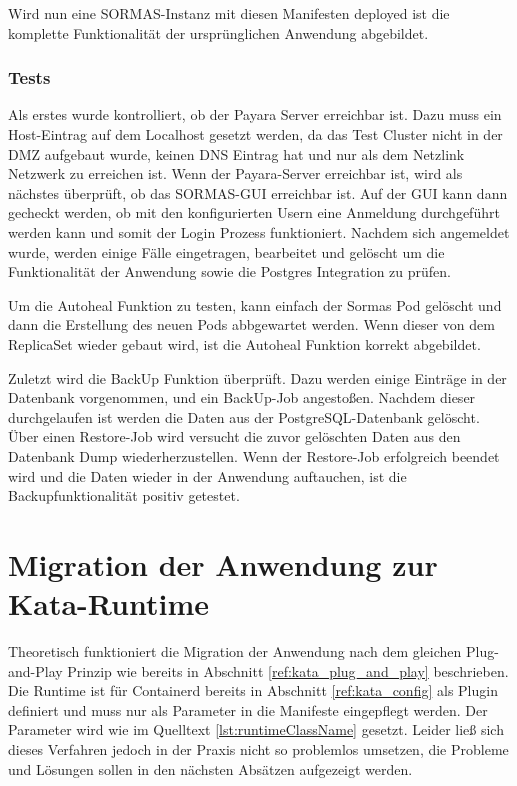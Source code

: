 Wird nun eine \ac{SORMAS}-Instanz mit diesen Manifesten deployed ist die komplette Funktionalität der ursprünglichen Anwendung abgebildet.

\subsubsection{Tests}
\label{ref:tests}
Als erstes wurde kontrolliert, ob der Payara Server erreichbar ist.
Dazu muss ein Host-Eintrag auf dem Localhost gesetzt werden, da das Test Cluster nicht in der \ac{DMZ} aufgebaut wurde, keinen \ac{DNS} Eintrag hat und nur als dem Netzlink Netzwerk zu erreichen ist. 
Wenn der Payara-Server erreichbar ist, wird als nächstes überprüft, ob das \ac{SORMAS}-\ac{GUI} erreichbar ist.
Auf der \ac{GUI} kann dann gecheckt werden, ob mit den konfigurierten Usern eine Anmeldung durchgeführt werden kann und somit der Login Prozess funktioniert.
Nachdem sich angemeldet wurde, werden einige Fälle eingetragen, bearbeitet und gelöscht um die Funktionalität der Anwendung sowie die Postgres Integration zu prüfen.

Um die Autoheal Funktion zu testen, kann einfach der Sormas Pod gelöscht und dann die Erstellung des neuen Pods abbgewartet werden.
Wenn dieser von dem ReplicaSet wieder gebaut wird, ist die Autoheal Funktion korrekt abgebildet.

Zuletzt wird die BackUp Funktion überprüft.
Dazu werden einige Einträge in der Datenbank vorgenommen, und ein BackUp-Job angestoßen. 
Nachdem dieser durchgelaufen ist werden die Daten aus der PostgreSQL-Datenbank gelöscht.
Über einen Restore-Job wird versucht die zuvor gelöschten Daten aus den Datenbank Dump wiederherzustellen. 
Wenn der Restore-Job erfolgreich beendet wird und die Daten wieder in der Anwendung auftauchen, ist die Backupfunktionalität positiv getestet.


\section{Migration der Anwendung zur Kata-Runtime}
Theoretisch funktioniert die Migration der Anwendung nach dem gleichen Plug-and-Play Prinzip wie bereits in Abschnitt \ref{ref:kata_plug_and_play} beschrieben.
Die Runtime ist für Containerd bereits in Abschnitt \ref{ref:kata_config} als Plugin definiert und muss nur als Parameter in die Manifeste eingepflegt werden.
Der Parameter wird wie im Quelltext \ref{lst:runtimeClassName} gesetzt.
Leider ließ sich dieses Verfahren jedoch in der Praxis nicht so problemlos umsetzen, die Probleme und Lösungen sollen in den nächsten Absätzen aufgezeigt werden. 

